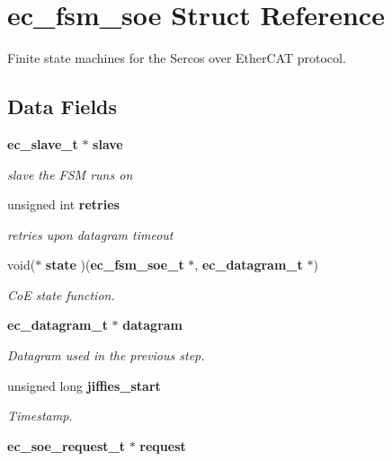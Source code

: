 \section{ec\-\_\-fsm\-\_\-soe Struct Reference}
\label{structec__fsm__soe}


Finite state machines for the Sercos over Ether\-C\-A\-T protocol.  


\subsection*{Data Fields}
\begin{DoxyCompactItemize}
\item 
{\bf ec\-\_\-slave\-\_\-t} $\ast$ {\bf slave}\label{structec__fsm__soe_ac70c33e8ea8a98b79d84c3ace3416180}

\begin{DoxyCompactList}\small\item\em slave the F\-S\-M runs on \end{DoxyCompactList}\item 
unsigned int {\bf retries}\label{structec__fsm__soe_a717e23d822ee8bca76b9b477ff078bb7}

\begin{DoxyCompactList}\small\item\em retries upon datagram timeout \end{DoxyCompactList}\item 
void($\ast$ {\bf state} )({\bf ec\-\_\-fsm\-\_\-soe\-\_\-t} $\ast$, {\bf ec\-\_\-datagram\-\_\-t} $\ast$)\label{structec__fsm__soe_a07bba81cf72365b14c57924a6c7b5e63}

\begin{DoxyCompactList}\small\item\em Co\-E state function. \end{DoxyCompactList}\item 
{\bf ec\-\_\-datagram\-\_\-t} $\ast$ {\bf datagram}
\begin{DoxyCompactList}\small\item\em Datagram used in the previous step. \end{DoxyCompactList}\item 
unsigned long {\bf jiffies\-\_\-start}
\begin{DoxyCompactList}\small\item\em Timestamp. \end{DoxyCompactList}\item 
{\bf ec\-\_\-soe\-\_\-request\-\_\-t} $\ast$ {\bf request}\label{structec__fsm__soe_add6279a51617da94d91420bb05e57a7c}


\end{DoxyCompactItemize}
